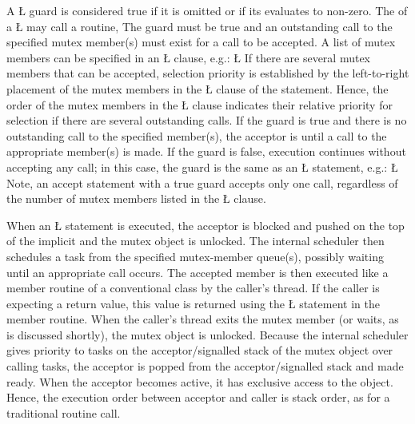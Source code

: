 \documentclass[openright,twoside]{report}
\begin{document}
A \LGinlinetrue\LGbegin\lgrinde\L{}\endlgrinde\LGend{} guard is considered true if it is omitted or if its  evaluates to non-zero.
The  of a \LGinlinetrue\LGbegin\lgrinde\L{}\endlgrinde\LGend{} may call a routine, 
The guard must be true and an outstanding call to the specified mutex member(s) must exist for a call to be accepted.
A list of mutex members can be specified in an \LGinlinetrue\LGbegin\lgrinde\L{}\endlgrinde\LGend{} clause, e.g.:
\LGinlinefalse\LGbegin\lgrinde
\L{}
\endlgrinde\LGend
If there are several mutex members that can be accepted, selection priority is established by the left-to-right placement of the mutex members in the \LGinlinetrue\LGbegin\lgrinde\L{}\endlgrinde\LGend{} clause of the statement.
Hence, the order of the mutex members in the \LGinlinetrue\LGbegin\lgrinde\L{}\endlgrinde\LGend{} clause indicates their relative priority for selection if there are several outstanding calls.
If the guard is true and there is no outstanding call to the specified member(s), the acceptor is  until a call to the appropriate member(s) is made.
If the guard is false, execution continues without accepting any call;
in this case, the guard is the same as an \LGinlinetrue\LGbegin\lgrinde\L{}\endlgrinde\LGend{} statement, e.g.:
\LGinlinefalse\LGbegin\lgrinde
\L{}
\endlgrinde\LGend
Note, an accept statement with a true guard accepts only one call, regardless of the number of mutex members listed in the \LGinlinetrue\LGbegin\lgrinde\L{}\endlgrinde\LGend{} clause.

When an \LGinlinetrue\LGbegin\lgrinde\L{}\endlgrinde\LGend{} statement is executed, the acceptor is blocked and pushed on the top of the implicit  and the mutex object is unlocked.
The internal scheduler then schedules a task from the specified mutex-member queue(s), possibly waiting until an appropriate call occurs.
The accepted member is then executed like a member routine of a conventional class by the caller's thread.
If the caller is expecting a return value, this value is returned using the \LGinlinetrue\LGbegin\lgrinde\L{}\endlgrinde\LGend{} statement in the member routine.
When the caller's thread exits the mutex member (or waits, as is discussed shortly), the mutex object is unlocked.
Because the internal scheduler gives priority to tasks on the acceptor/signalled stack of the mutex object over calling tasks, the acceptor is popped from the acceptor/signalled stack and made ready.
When the acceptor becomes active, it has exclusive access to the object.
Hence, the execution order between acceptor and caller is stack order, as for a traditional routine call.
\end{document}
